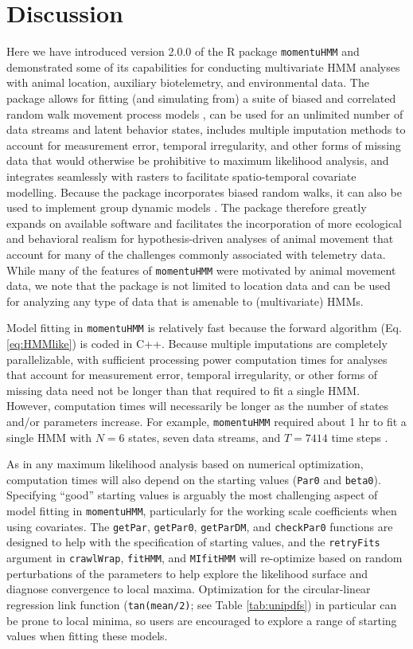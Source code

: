 \documentclass[12pt]{article}\usepackage[]{graphicx}\usepackage[]{xcolor}
\begin{document}
\section{Discussion}
Here we have introduced version 2.0.0 of the R package \verb|momentuHMM| and demonstrated some of its capabilities for conducting multivariate HMM analyses with animal location, auxiliary biotelemetry, and environmental data. The package allows for fitting (and simulating from) a suite of biased and correlated random walk movement process models \citep[e.g.][]{McClintockEtAl2012}, can be used for an unlimited number of data streams and latent behavior states, includes multiple imputation methods to account for measurement error, temporal irregularity, and other forms of missing data that would otherwise be prohibitive to maximum likelihood analysis, and integrates seamlessly with rasters to facilitate spatio-temporal covariate modelling. Because the package incorporates biased random walks, it can also be used to implement group dynamic models \cite[e.g.][]{LangrockEtAl2014}. The package therefore greatly expands on available software and facilitates the incorporation of more ecological and behavioral realism for hypothesis-driven analyses of animal movement that account for many of the challenges commonly associated with telemetry data. While many of the features of \verb|momentuHMM| were motivated by animal movement data, we note that the package is not limited to location data and can be used for analyzing any type of data that is amenable to (multivariate) HMMs.

Model fitting in \verb|momentuHMM| is relatively fast because the forward algorithm (Eq. \ref{eq:HMMlike}) is coded in C++. Because multiple imputations are completely parallelizable, with sufficient processing power computation times for analyses that account for measurement error, temporal irregularity, or other forms of missing data need not be longer than that required to fit a single HMM.  However, computation times will necessarily be longer as the number of states and/or parameters increase. For example, \verb|momentuHMM| required about 1 hr to fit a single HMM with $N=6$ states, seven data streams, and $T=7414$ time steps \citep{McClintock2017}. 

As in any maximum likelihood analysis based on numerical optimization, computation times will also depend on the starting values (\verb|Par0| and \verb|beta0|). Specifying ``good'' starting values is arguably the most challenging aspect of model fitting in \verb|momentuHMM|, particularly for the working scale coefficients when using covariates. The \verb|getPar|, \verb|getPar0|, \verb|getParDM|, and \verb|checkPar0| functions are designed to help with the specification of starting values, and the \verb|retryFits| argument in \verb|crawlWrap|, \verb|fitHMM|, and \verb|MIfitHMM| will re-optimize based on random perturbations of the parameters to help explore the likelihood surface and diagnose convergence to local maxima. Optimization for the circular-linear regression link function (\verb|tan(mean/2)|; see Table \ref{tab:unipdfs}) in particular can be prone to local minima, so users are encouraged to explore a range of starting values when fitting these models.
\end{document}
